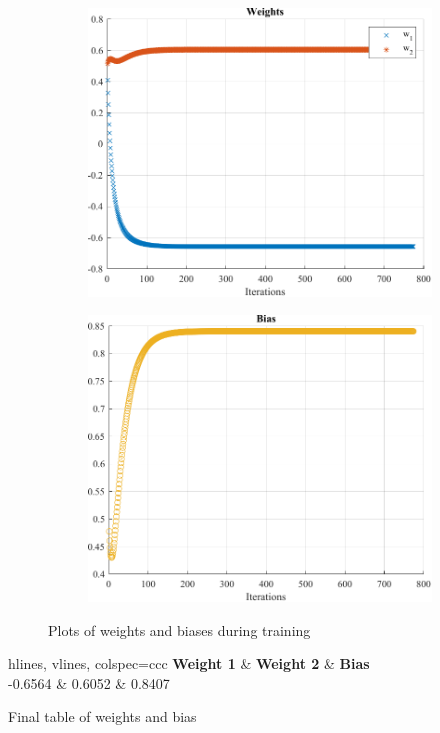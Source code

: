 \begin{figure}[htpb]
	\centering
	\begin{subfigure}[l]{0.47\textwidth}
		\centering
		\includegraphics[width=\textwidth]{../Problem 10/prob10_adaline_weights.pdf}
	\end{subfigure}
	\hspace{1mm}
	\begin{subfigure}[r]{0.47\textwidth}
		\centering
		\includegraphics[width=\textwidth]{../Problem 10/prob10_adaline_biases.pdf}
	\end{subfigure}
	\caption{Plots of weights and biases during training}
	\label{fig:prob10_plot_weights_biases}
\end{figure}

\begin{table}[H]
	\centering
	\begin{tblr}{hlines, vlines, colspec={ccc}}
		\textbf{Weight 1} & \textbf{Weight 2} & \textbf{Bias} \\
		-0.6564 & 0.6052 & 0.8407 \\
	\end{tblr}
	\caption{Final table of weights and bias}
	\label{table:prob10_final_weight_bias}
\end{table}